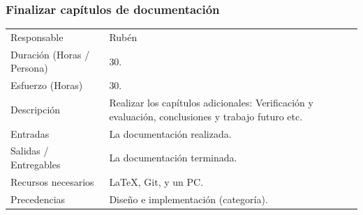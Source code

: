 \subsubsection{Finalizar cap\'{i}tulos de documentaci\'{o}n}
\begin{table}[H]
    \begin{center}
        \begin{tabular}{l p{8cm}}
            Responsable                           & Rub\'{e}n \\
            Duraci\'{o}n (Horas  / Persona)       & 30. \\ 
            Esfuerzo (Horas)                      & 30. \\
            Descripci\'{o}n                       & Realizar los cap\'{i}tulos adicionales: Verificaci\'{o}n y evaluaci\'{o}n, conclusiones y trabajo futuro
                                                    etc. \\
            Entradas                              & La documentaci\'{o}n realizada. \\
            Salidas / Entregables                 & La documentaci\'{o}n terminada. \\
            Recursos necesarios                   & \LaTeX, Git, y un PC. \\
            Precedencias                          & Dise\~{n}o e implementaci\'{o}n (categor\'{i}a). \\
        \end{tabular}
    \end{center}
    
\end{table}

